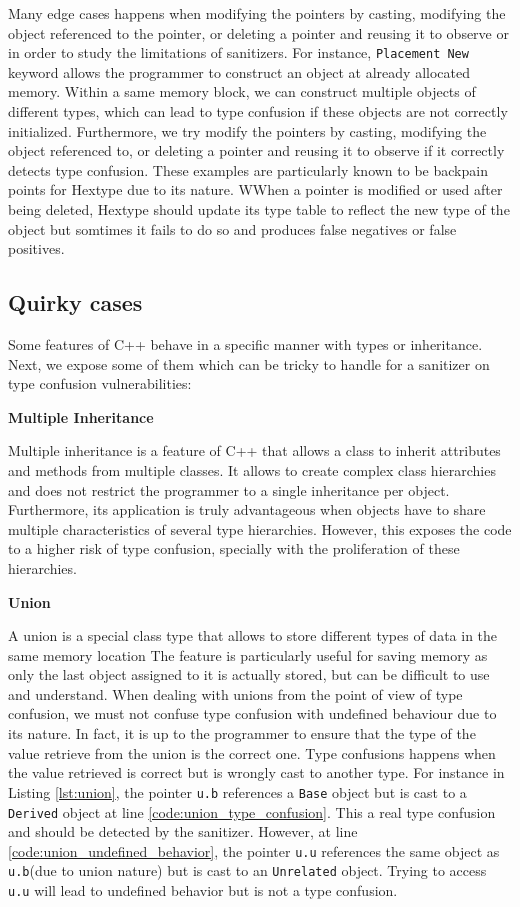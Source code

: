 \documentclass[a4paper,11pt,oneside]{report}
\begin{document}
\noindent{}Many edge cases happens when modifying the pointers by casting, modifying the object referenced to the pointer, 
or deleting a pointer and reusing it to observe or in order to study the limitations of sanitizers. For instance, 
\texttt{Placement New} keyword allows the programmer to construct an object at already allocated memory. 
Within a same memory block, we can construct multiple objects of different types, which can lead to type confusion
if these objects are not correctly initialized. Furthermore, we try modify the pointers by casting, modifying the object referenced to, 
or deleting a pointer and reusing it to observe if it correctly detects type confusion. These examples are particularly known to 
be backpain points for Hextype due to its nature. WWhen a pointer is modified or used after being deleted, Hextype should update 
its type table to reflect the new type of the object but somtimes it fails to do so and produces false negatives or false positives.

\subsection{Quirky cases}

Some features of C++ behave in a specific manner with types or inheritance. Next, we expose some of them 
which can be tricky to handle for a sanitizer on type confusion vulnerabilities:

\textbf{Multiple Inheritance}

\noindent{}Multiple inheritance is a feature of C++ that allows a class to inherit attributes and methods from multiple classes.
It allows to create complex class hierarchies and does not restrict the programmer to a single inheritance per object. Furthermore,
its application is truly advantageous when objects have to share multiple characteristics of several type hierarchies. 
However, this exposes the code to a higher risk of type confusion, specially with the proliferation of these hierarchies.  

\textbf{Union}

\noindent{}A union is a special class type that allows to store different types of data in the same memory location
The feature is particularly useful for saving memory as only the last object assigned to it is actually stored, but 
can be difficult to use and understand. When dealing with unions from the point of view of type confusion, 
we must not confuse type confusion with undefined behaviour due to its nature. In fact, it is up to the programmer to ensure
that the type of the value retrieve from the union is the correct one. Type confusions happens when 
the value retrieved is correct but is wrongly cast to another type. For instance in Listing \autoref{lst:union}, 
the pointer \texttt{u.b} references a \texttt{Base} object but is cast to a \texttt{Derived} object at line \ref{code:union_type_confusion}.
This a real type confusion and should be detected by the sanitizer. However, at line \ref{code:union_undefined_behavior},
the pointer \texttt{u.u} references the same object as \texttt{u.b}(due to union nature) but is cast to an \texttt{Unrelated} object. 
Trying to access \texttt{u.u} will lead to undefined behavior but is not a type confusion.
\end{document}

